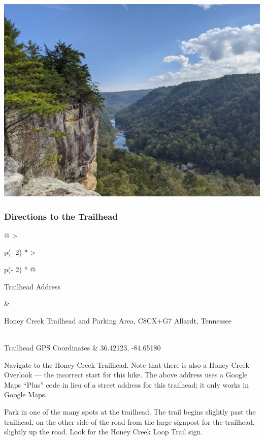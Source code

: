 \documentclass[
  letterpaper,
  DIV=11,
  numbers=noendperiod]{scrartcl}
\begin{document}
\includegraphics{img/trail-18-figure-01.jpg}

\hypertarget{directions-to-the-trailhead-18}{%
\subsubsection{Directions to the
Trailhead}\label{directions-to-the-trailhead-18}}

\begin{longtable}[]{@{}
  >{\raggedright\arraybackslash}p{(\columnwidth - 2\tabcolsep) * }
  >{\raggedright\arraybackslash}p{(\columnwidth - 2\tabcolsep) * }@{}}
\toprule\noalign{}
\begin{minipage}[b]{\linewidth}\raggedright
Trailhead Address
\end{minipage} & \begin{minipage}[b]{\linewidth}\raggedright
Honey Creek Trailhead and Parking Area, C8CX+G7 Allardt, Tennessee
\end{minipage} \\
\midrule\noalign{}
\endhead
\bottomrule\noalign{}
\endlastfoot
Trailhead GPS Coordinates & 36.42123, -84.65180 \\
\end{longtable}

Navigate to the Honey Creek Trailhead. Note that there is also a Honey
Creek Overlook --- the incorrect start for this hike. The above address
uses a Google Maps ``Plus'' code in lieu of a street address for this
trailhead; it only works in Google Maps.

Park in one of the many spots at the trailhead. The trail begins
slightly past the trailhead, on the other side of the road from the
large signpost for the trailhead, slightly up the road. Look for the
Honey Creek Loop Trail sign.
\end{document}
